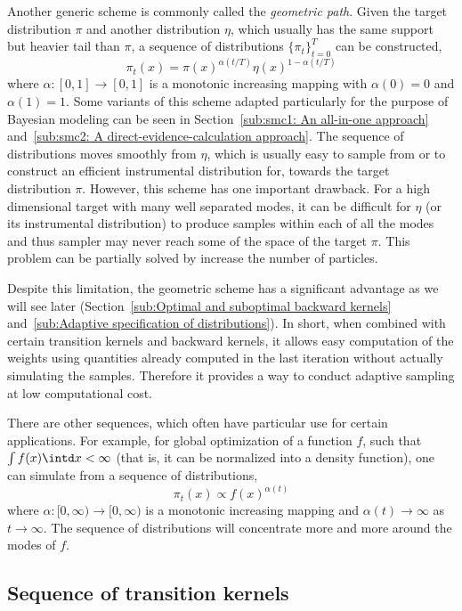 Another generic scheme is commonly called the \emph{geometric path}. Given the
target distribution $\pi$ and another distribution $\eta$, which usually has
the same support but heavier tail than $\pi$, a sequence of distributions
$\{\pi_t\}_{t=0}^T$ can be constructed,
\begin{equation}
  \pi_t(x) =
  \pi(x)^{\alpha(t/T)}\eta(x)^{1-\alpha(t/T)} \end{equation} where
$\alpha:[0,1]\to[0,1]$ is a monotonic increasing mapping with $\alpha(0) = 0$
and $\alpha(1) = 1$. Some variants of this scheme adapted particularly for the
purpose of Bayesian modeling can be seen in Section~\ref{sub:smc1: An
  all-in-one approach} and~\ref{sub:smc2: A direct-evidence-calculation
  approach}. The sequence of distributions moves smoothly from $\eta$, which
is usually easy to sample from or to construct an efficient instrumental
distribution for, towards the target distribution $\pi$. However, this scheme
has one important drawback. For a high dimensional target with many well
separated modes, it can be difficult for $\eta$ (or its instrumental
distribution) to produce samples within each of all the modes and thus sampler
may never reach some of the space of the target $\pi$. This problem can be
partially solved by increase the number of particles.

Despite this limitation, the geometric scheme has a significant advantage as
we will see later (Section~\ref{sub:Optimal and suboptimal backward kernels}
and~\ref{sub:Adaptive specification of distributions}). In short, when
combined with certain transition kernels and backward kernels, it allows easy
computation of the weights using quantities already computed in the last
iteration without actually simulating the samples. Therefore it provides a way
to conduct adaptive sampling at low computational cost.

There are other sequences, which often have particular use for certain
applications. For example, for global optimization of a function $f$, such
that $\int f(x)\intd x <\infty$ (that is, it can be normalized into a density
function), one can simulate from a sequence of distributions,
\begin{equation}
  \pi_t(x) \propto f(x)^{\alpha(t)}
\end{equation}
where $\alpha:[0,\infty)\to[0,\infty)$ is a monotonic increasing mapping and
$\alpha(t)\to\infty$ as $t\to\infty$. The sequence of distributions will
concentrate more and more around the modes of $f$.

\subsection{Sequence of transition kernels}
\label{sub:Sequence of transition kernels}

